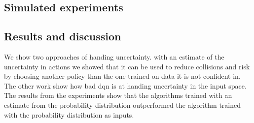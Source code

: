 \subsection{Simulated experiments}

\subsection{Results and discussion}
We show two approaches of handing uncertainty. with an estimate of the uncertainty in actions we showed that it can be used to reduce collisions and risk by choosing another policy than the one trained on data it is not confident in. 
The other work show how bad \gls{dqn} is at handing uncertainty in the input space. The results from the experiments show that the algorithms trained with an estimate from the probability distribution outperformed the algorithm trained with the probability distribution as inputs. 